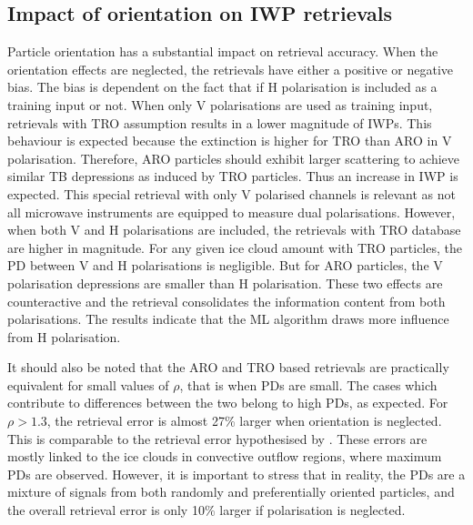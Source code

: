 \documentclass[amt, manuscript]{copernicus}
\begin{document}
\subsection{Impact of orientation on IWP retrievals}
%
Particle orientation has a substantial impact on retrieval accuracy. When the orientation effects are neglected, the retrievals have either a  positive or negative bias. The bias is dependent on the fact that if H polarisation is included as a training input or not. When only V polarisations are used as training input, retrievals with TRO assumption results in a lower magnitude of IWPs. This behaviour is expected because the extinction is higher for TRO than ARO in V polarisation. Therefore, ARO particles should exhibit larger scattering to achieve similar TB depressions as induced by TRO particles. Thus an increase in IWP is expected. This special retrieval with only V polarised channels is relevant as not all microwave instruments are equipped to measure dual polarisations. However, when both V  and H  polarisations are included, the retrievals with TRO database are higher in magnitude. For any given ice cloud amount with TRO particles, the PD between V  and H  polarisations is negligible. But for ARO particles, the V polarisation depressions are smaller than H polarisation. These two effects are counteractive and the retrieval consolidates the information content from both polarisations. The results indicate that the ML algorithm draws more influence from H polarisation. 

It should also be noted that the ARO and TRO based retrievals are practically equivalent for small values of $\rho$, that is when PDs are small. The cases which contribute to differences between the two belong to high PDs, as expected. For $\rho > 1.3$, the retrieval error is almost 27\% larger when orientation is neglected. This is comparable to the retrieval error hypothesised by \citet{gong:micro:17}. These errors are mostly linked to the ice clouds in convective outflow regions, where maximum PDs are observed. However, it is important to stress  that in reality, the PDs are a mixture of signals from both randomly and preferentially oriented particles, and the overall retrieval error is only 10\% larger if polarisation is neglected. 
\end{document}
